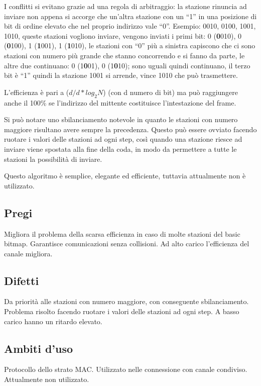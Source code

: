 I conflitti si evitano grazie ad una regola di arbitraggio: la stazione rinuncia ad inviare non appena si accorge che un'altra stazione con un “1” in una posizione di bit di ordine elevato che nel proprio indirizzo vale “0”.
Esempio: 0010, 0100, 1001, 1010, queste stazioni vogliono inviare, vengono inviati i primi bit: 0 (\textbf{0}010), 0 (\textbf{0}100), 1 (\textbf{1}001), 1 (\textbf{1}010), le stazioni con “0” più a sinistra capiscono che ci sono stazioni con numero più grande che stanno concorrendo e si fanno da parte, le altre due continuano: 0 (1\textbf{0}01), 0 (1\textbf{0}10); sono uguali quindi continuano, il terzo bit è “1” quindi la stazione 1001 si arrende, vince 1010 che può trasmettere.

L'efficienza è pari a ($d/d*log_2N$) (con d numero di bit) ma può raggiungere anche il 100\% se l'indirizzo del mittente costituisce l'intestazione del frame.

Si può notare uno sbilanciamento notevole in quanto le stazioni con numero maggiore risultano avere sempre la precedenza. Questo può essere ovviato facendo ruotare i valori delle stazioni ad ogni step, così quando una stazione riesce ad inviare viene spostata alla fine della coda, in modo da permettere a tutte le stazioni la possibilità di inviare.

Questo algoritmo è semplice, elegante ed efficiente, tuttavia attualmente non è utilizzato.

\subsection{Pregi}
Migliora il problema della scarsa efficienza in caso di molte stazioni del basic bitmap.
Garantisce comunicazioni senza collisioni.
Ad alto carico l'efficienza del canale migliora.

\subsection{Difetti}
Da priorità alle stazioni con numero maggiore, con conseguente sbilanciamento. Problema risolto facendo ruotare i valori delle stazioni ad ogni step. 
A basso carico hanno un ritardo elevato.
\subsection{Ambiti d'uso}
Protocollo dello strato MAC. Utilizzato nelle connessione con canale condiviso. Attualmente non utilizzato.

